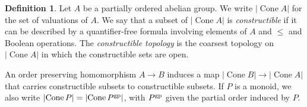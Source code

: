 \documentclass[10pt]{article}
\numberwithin{equation}{section}
\theoremstyle{definition}
\newtheorem{definition}[paragraph]{Definition}
\theoremstyle{remark}
\def\Cone{\operatorname{Cone}}
\newcommand{\gp}[1]{#1^{\rm gp}}
\newcommand{\utopcone}[1]{\left\vert\Cone #1 \right\vert}
\begin{document}
\begin{definition} \label{def:8}
	Let $A$ be a partially ordered abelian group.  We write $\utopcone A$ for the set of valuations of $A$.  We say that a subset of $\utopcone A$ is \emph{constructible} 
	if it can be described by a quantifier-free 
	formula involving elements of $A$ and $\leq$ and Boolean operations.  The \emph{constructible topology} 
	is the coarsest topology on $\utopcone A$ in which the constructible 
	sets are open.
\end{definition}

An order preserving homomorphism $A \to B$ induces a map $\utopcone B \to \utopcone A$ that carries constructible 
subsets to constructible 
subsets.  If $P$ is a monoid, we also write $\utopcone P = \utopcone {\gp P}$, with $\gp P$ given the partial order induced by $P$.  
\end{document}
